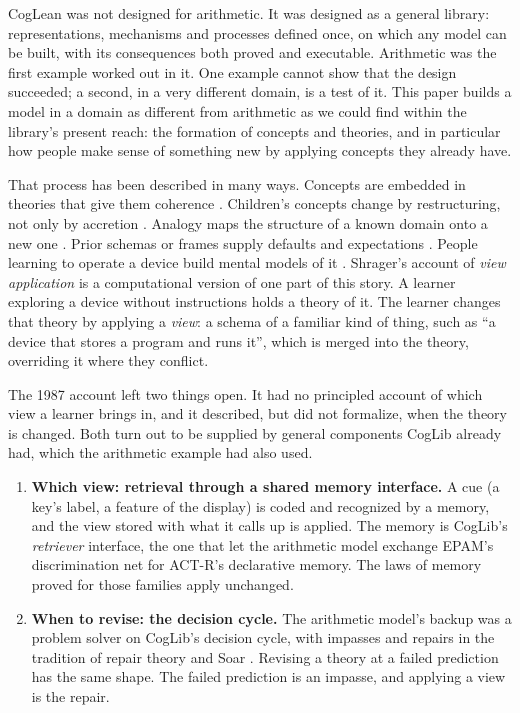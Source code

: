 \documentclass[11pt]{article}
\begin{document}
CogLean was not designed for arithmetic. It was designed as a general library: representations, mechanisms and processes defined once, on which any model can be built, with its consequences both proved and executable. Arithmetic was the first example worked out in it. One example cannot show that the design succeeded; a second, in a very different domain, is a test of it. This paper builds a model in a domain as different from arithmetic as we could find within the library's present reach: the formation of concepts and theories, and in particular how people make sense of something new by applying concepts they already have.

That process has been described in many ways. Concepts are embedded in theories that give them coherence \citep{murphy1985}. Children's concepts change by restructuring, not only by accretion \citep{carey1985,rumelhart1976}. Analogy maps the structure of a known domain onto a new one \citep{gentner1983}. Prior schemas or frames supply defaults and expectations \citep{minsky1975}. People learning to operate a device build mental models of it \citep{gentner1983mm,kieras1984}. Shrager's account of \emph{view application} \citep{shrager1987} is a computational version of one part of this story. A learner exploring a device without instructions \citep{shrager1986} holds a theory of it. The learner changes that theory by applying a \emph{view}: a schema of a familiar kind of thing, such as ``a device that stores a program and runs it'', which is merged into the theory, overriding it where they conflict.

The 1987 account left two things open. It had no principled account of which view a learner brings in, and it described, but did not formalize, when the theory is changed. Both turn out to be supplied by general components CogLib already had, which the arithmetic example had also used.

\begin{enumerate}
  \item \textbf{Which view: retrieval through a shared memory interface.} A cue (a key's label, a feature of the display) is coded and recognized by a memory, and the view stored with what it calls up is applied. The memory is CogLib's \emph{retriever} interface, the one that let the arithmetic model exchange EPAM's discrimination net for ACT-R's declarative memory. The laws of memory proved for those families apply unchanged.
  \item \textbf{When to revise: the decision cycle.} The arithmetic model's backup was a problem solver on CogLib's decision cycle, with impasses and repairs in the tradition of repair theory and Soar \citep{brown1980,laird1987}. Revising a theory at a failed prediction has the same shape. The failed prediction is an impasse, and applying a view is the repair.
\end{enumerate}
\end{document}
